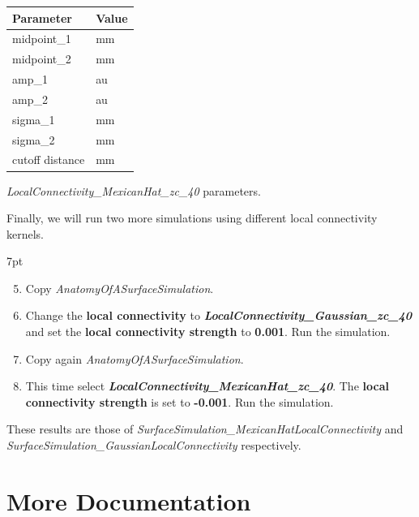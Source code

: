 \documentclass{tufte-handout}
\newenvironment{simulation}{%
  \def\FrameCommand{%
    \hspace{1pt}%
    {\color{ForestGreen}\vrule width 2pt}%
    {\color{simulationshade}\vrule width 4pt}%
    \colorbox{simulationshade}%
  }%
  \MakeFramed{\advance\hsize-\width\FrameRestore}%
  \noindent\hspace{-4.55pt}%
  \begin{adjustwidth}{}{7pt}%
  \vspace{2pt}\vspace{2pt}%
}
{%
  \vspace{2pt}\end{adjustwidth}\endMakeFramed%
}
\begin{document}
\begin{margintable}
  \centering
  \selectfont
  \begin{tabular}{ll}
    \toprule
    Parameter & Value \\
    \midrule
             midpoint\_1          &   \unit[0]{mm}   \\
             midpoint\_2          &   \unit[0]{mm}   \\
             amp\_1               &   \unit[2]{au}   \\
             amp\_2               &   \unit[1]{au}   \\
             sigma\_1             &   \unit[5]{mm}   \\
             sigma\_2             &   \unit[15]{mm}  \\
             cutoff distance      & \unit[40]{mm}    \\
    \bottomrule
  \end{tabular}
  \caption{\textit{LocalConnectivity\_MexicanHat\_zc\_40} parameters. }
  \label{tab:mexicanstab}
\end{margintable}

Finally, we will run two  more simulations using different local connectivity kernels. 

\begin{simulation}
\begin{enumerate}[resume]
\setcounter{enumi}{4}
\item Copy \textit{AnatomyOfASurfaceSimulation}.
\item Change the \textbf{local connectivity} to \textbf{\textit{LocalConnectivity\_Gaussian\_zc\_40}} and set the \textbf{local connectivity strength} to \textbf{0.001}. Run the simulation.
\item Copy again \textit{AnatomyOfASurfaceSimulation}. 
\item This time select \textbf{\textit{LocalConnectivity\_MexicanHat\_zc\_40}}. The \textbf{local connectivity strength} is set to \textbf{-0.001}. Run the simulation. 
\end{enumerate}
\end{simulation}

These results are those of \textit{SurfaceSimulation\_MexicanHatLocalConnectivity} and \textit{SurfaceSimulation\_GaussianLocalConnectivity} respectively.
 

\section{More Documentation}\label{sec:more-doc}
\end{document}
